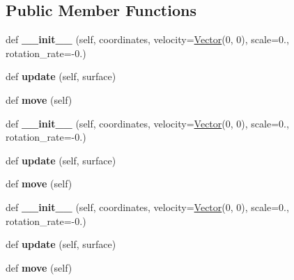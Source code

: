 \subsection*{Public Member Functions}
\begin{DoxyCompactItemize}
\item 
def {\bfseries \+\_\+\+\_\+init\+\_\+\+\_\+} (self, coordinates, velocity=\hyperlink{classVector_1_1Vector}{Vector}(0, 0), scale=0., rotation\+\_\+rate=-\/0.)\hypertarget{classAsteroid_1_1Asteroid_a97fe00ef73eaa80de7eec57530565e7c}{}\label{classAsteroid_1_1Asteroid_a97fe00ef73eaa80de7eec57530565e7c}

\item 
def {\bfseries update} (self, surface)\hypertarget{classAsteroid_1_1Asteroid_ac5a9f9ae0dfd3ff4aa2dabfdd820ebd1}{}\label{classAsteroid_1_1Asteroid_ac5a9f9ae0dfd3ff4aa2dabfdd820ebd1}

\item 
def {\bfseries move} (self)\hypertarget{classAsteroid_1_1Asteroid_af44489831e21c1caa55035370f671d41}{}\label{classAsteroid_1_1Asteroid_af44489831e21c1caa55035370f671d41}

\item 
def {\bfseries \+\_\+\+\_\+init\+\_\+\+\_\+} (self, coordinates, velocity=\hyperlink{classVector_1_1Vector}{Vector}(0, 0), scale=0., rotation\+\_\+rate=-\/0.)\hypertarget{classAsteroid_1_1Asteroid_a97fe00ef73eaa80de7eec57530565e7c}{}\label{classAsteroid_1_1Asteroid_a97fe00ef73eaa80de7eec57530565e7c}

\item 
def {\bfseries update} (self, surface)\hypertarget{classAsteroid_1_1Asteroid_ac5a9f9ae0dfd3ff4aa2dabfdd820ebd1}{}\label{classAsteroid_1_1Asteroid_ac5a9f9ae0dfd3ff4aa2dabfdd820ebd1}

\item 
def {\bfseries move} (self)\hypertarget{classAsteroid_1_1Asteroid_af44489831e21c1caa55035370f671d41}{}\label{classAsteroid_1_1Asteroid_af44489831e21c1caa55035370f671d41}

\item 
def {\bfseries \+\_\+\+\_\+init\+\_\+\+\_\+} (self, coordinates, velocity=\hyperlink{classVector_1_1Vector}{Vector}(0, 0), scale=0., rotation\+\_\+rate=-\/0.)\hypertarget{classAsteroid_1_1Asteroid_a97fe00ef73eaa80de7eec57530565e7c}{}\label{classAsteroid_1_1Asteroid_a97fe00ef73eaa80de7eec57530565e7c}

\item 
def {\bfseries update} (self, surface)\hypertarget{classAsteroid_1_1Asteroid_ac5a9f9ae0dfd3ff4aa2dabfdd820ebd1}{}\label{classAsteroid_1_1Asteroid_ac5a9f9ae0dfd3ff4aa2dabfdd820ebd1}

\item 
def {\bfseries move} (self)\hypertarget{classAsteroid_1_1Asteroid_af44489831e21c1caa55035370f671d41}{}\label{classAsteroid_1_1Asteroid_af44489831e21c1caa55035370f671d41}

\end{DoxyCompactItemize}
